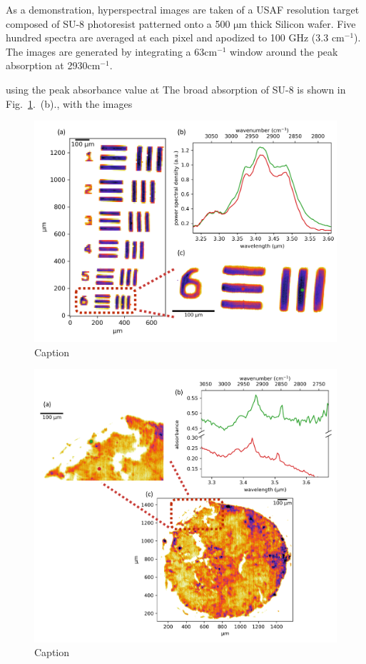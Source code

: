 \documentclass{optica-article}
\begin{document}
As a demonstration, hyperspectral images are taken of a USAF resolution target composed of SU-8 photoresist patterned onto a 500 $\mathrm{\mu m}$ thick Silicon wafer. Five hundred spectra are averaged at each pixel and apodized to 100 GHz (3.3 $\mathrm{cm^{-1}}$). The images are generated by integrating a 63$\mathrm{cm^{-1}}$ window around the peak absorption at 2930$\mathrm{cm^{-1}}$.

using the peak absorbance value at The broad absorption of SU-8 is shown in Fig.~\ref{fig:su8}.~(b)., with the images 

\begin{figure}[h]
    \centering
    \includegraphics[width=\linewidth]{su8_image.png}
    \caption{Caption}
    \label{fig:su8}
\end{figure}

\begin{figure}[h]
    \centering
    \includegraphics[width=\linewidth]{bio_image.png}
    \caption{Caption}
    \label{fig:bio}
\end{figure}
\end{document}
